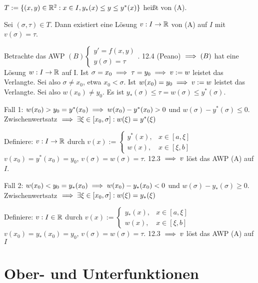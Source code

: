 \documentclass[a4paper,twoside,DIV15,BCOR12mm]{scrbook}
\begin{document}
\begin{definition}
$T := \{ (x,y) \in \mathbb{R}^2 : x \in I, y_*(x) \leq y \leq y^*(x) \}$ heißt  von (A).
\end{definition}


\begin{satz} %
Sei $(\sigma, \tau) \in T$. Dann existiert eine Lösung $v: I \to \mathbb{R}$ von (A) auf $I$ mit $v(\sigma) = \tau$.
\end{satz}

\begin{beweis}
Betrachte das AWP $ (B) \begin{cases} y' =f(x,y) \\ y(\sigma) = \tau  \end{cases}.$
12.4 (Peano) $\implies (B)$ hat eine  Lösung $ w: I \to \mathbb{R}$ auf I. 
Ist $\sigma = x_0 \implies \tau = y_0 \implies v := w$ leistet das Verlangte. Sei also $\sigma \neq x_0$, etwa $x_0 < \sigma$.
Ist $w(x_0) = y_0 \implies v := w$ leistet das Verlangte. Sei also $w(x_0) \neq y_0$.
Es ist $y_*(\sigma)  \leq \tau = w(\sigma) \leq y^*(\sigma)$.

Fall 1: $w(x_0) > y_0 = y^*(x_0) \implies w(x_0) - y^*(x_0) > 0$ und $w(\sigma) - y^*(\sigma) \leq 0$.
Zwischenwertsatz $\implies \exists \xi \in [x_0, \sigma] : w(\xi) = y^*(\xi)$

Definiere: $v:I \to \mathbb{R}$ durch $ v(x) := \begin{cases} y^*(x),& x \in [a, \xi] \\ w(x),& x \in [\xi, b] \end{cases}$
$v(x_0) = y^*(x_0) = y_0$, $v(\sigma) = w(\sigma) = \tau.$ 12.3 $\implies v$ löst das AWP (A) auf $I$.


Fall 2: $w(x_0) < y_0 = y_*(x_0) \implies w(x_0) - y_*(x_0) < 0$ und $w(\sigma) - y_*(\sigma) \geq 0$.
Zwischenwertsatz $\implies \exists \xi \in [x_0, \sigma] : w(\xi) = y_*(\xi)$

Definiere: $v:I \in \mathbb{R}$ durch $v(x) := \begin{cases} y_*(x),& x \in [a, \xi] \\ w(x),& x \in [\xi, b] \end{cases}$
$v(x_0) = y_*(x_0) = y_0$, $v(\sigma) = w(\sigma) = \tau.$ 12.3 $\implies v$ löst das AWP (A) auf $I$
\end{beweis}








\chapter{Ober- und Unterfunktionen}
\end{document}

